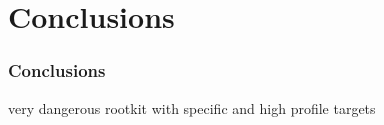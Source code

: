 \section{Conclusions}

\begin{frame}
\frametitle{Conclusions}
    very dangerous rootkit with specific and high profile targets
\end{frame}